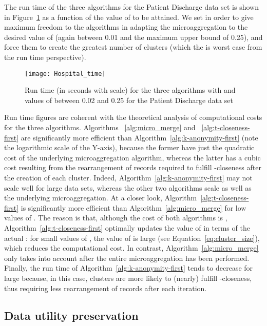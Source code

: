 \documentclass[10pt,journal,compsoc]{IEEEtran}
\theoremstyle{definition}
\theoremstyle{plain}
\begin{document}
The run time of the three algorithms for the Patient Discharge data set is shown in
Figure~\ref{fig:time} as a function of the value of  to be attained.
We set  in order to give maximum freedom to the algorithms in 
adapting the microaggregation to the desired value of  (again between 0.01 and 
the maximum upper bound of 0.25), and force them to create the greatest
number of clusters (which the is worst case from the run time perspective).


\begin{figure}[!t]
	\centering
	\texttt{[image: Hospital\_time]}
	\protect\caption{Run time (in seconds with  scale) for the three algorithms with  
and values of 	between 0.02 and 0.25 for the Patient Discharge data set\label{fig:time}}
\end{figure}

Run time figures are coherent with the theoretical analysis of 
computational costs for the three algorithms. Algorithms ~\ref{alg:micro_merge} 
and ~\ref{alg:t-closeness-first} are significantly more efficient than Algorithm~\ref{alg:k-anonymity-first}
(note the logarithmic scale of the Y-axis), because the former have just 
the quadratic 
cost of the underlying microaggregation algorithm, 
whereas the latter has a cubic cost resulting from
the rearrangement of records required to fulfill -closeness after the creation of each cluster.
Indeed, Algorithm~\ref{alg:k-anonymity-first} may 
not scale well for large
data sets, whereas the other two algorithms scale 
as well as the underlying microaggregation.
At a closer look, Algorithm~\ref{alg:t-closeness-first} is 
significantly more efficient than Algorithm~\ref{alg:micro_merge} for low values of .
The reason is that, although the cost of both algorithms is ,
Algorithm~\ref{alg:t-closeness-first} optimally updates 
the value of  in terms of the actual :
for small values of , the value of  is large (see Equation~\ref{eq:cluster_size}),
which reduces the computational cost.
In contrast, Algorithm~\ref{alg:micro_merge} only takes 
into account after the entire microaggregation has been performed. 
Finally, the run time of Algorithm~\ref{alg:k-anonymity-first} tends 
to decrease for large  because, in this case, clusters are more
likely to (nearly) fulfill
-closeness, thus requiring less rearrangement of records 
after each iteration. 


\subsection{Data utility preservation}
\label{utility}
\end{document}

